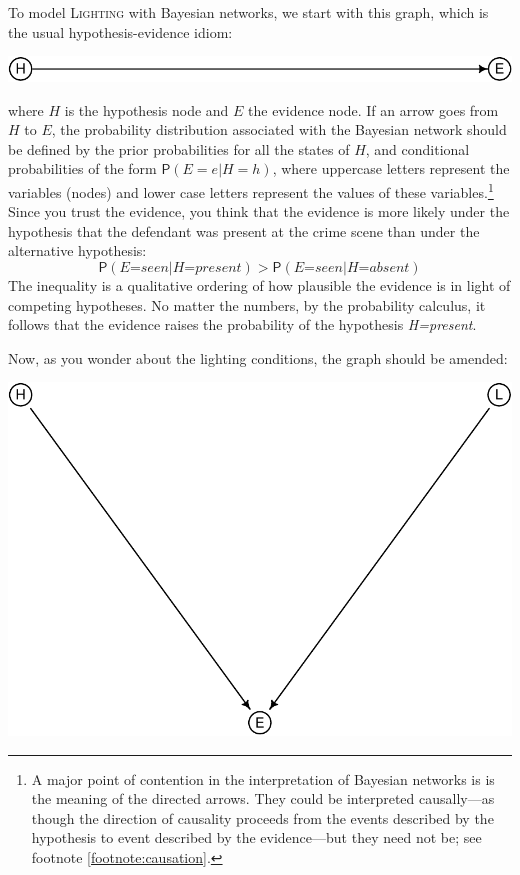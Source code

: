 \documentclass[
  11pt,
  dvipsnames,enabledeprecatedfontcommands]{scrartcl}
\newcommand{\pr}[1]{\ensuremath{\mathsf{P}(#1)}}
\begin{document}
To model \textsc{Lighting} with Bayesian networks, we start with this
graph, which is the usual hypothesis-evidence idiom:

\begin{center}\includegraphics[width=0.5\linewidth,height=0.5\textheight]{ReplyToSteeleStefansson4_files/figure-latex/heDAG-1} \end{center}

\noindent where \(H\) is the hypothesis node and \(E\) the evidence
node. If an arrow goes from \(H\) to \(E\), the probability distribution
associated with the Bayesian network should be defined by the prior
probabilities for all the states of \(H\), and conditional probabilities
of the form \(\pr{E=e \vert H=h}\), where uppercase letters represent
the variables (nodes) and lower case letters represent the values of
these variables.\footnote{A major point of contention in the
  interpretation of Bayesian networks is is the meaning of the directed
  arrows. They could be interpreted causally---as though the direction
  of causality proceeds from the events described by the hypothesis to
  event described by the evidence---but they need not be; see footnote
  \ref{footnote:causation}.} Since you trust the evidence, you think
that the evidence is more likely under the hypothesis that the defendant
was present at the crime scene than under the alternative hypothesis:
\[\pr{\textit{E=seen} \vert \textit{H=present}} > \pr{\textit{E=seen} \vert \textit{H=absent}}\]
The inequality is a qualitative ordering of how plausible the evidence
is in light of competing hypotheses. No matter the numbers, by the
probability calculus, it follows that the evidence raises the
probability of the hypothesis \textit{H=present}.

Now, as you wonder about the lighting conditions, the graph should be
amended:

\begin{center}\includegraphics[width=0.5\linewidth,height=0.3\textheight]{ReplyToSteeleStefansson4_files/figure-latex/lighting2DAG-1} \end{center}
\end{document}
